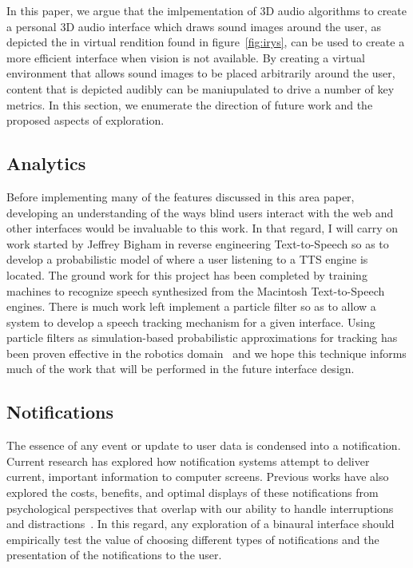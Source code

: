 In this paper, we argue that the imlpementation of 3D audio algorithms to create 
a personal 3D audio interface which draws sound images around the user, as depicted
the in virtual rendition found in figure~\ref{fig:irys}, can be used to create
a more efficient interface when vision is not available. By creating a virtual
environment that allows sound images to be placed arbitrarily around the user,
content that is depicted audibly can be maniupulated to drive a number of key 
metrics. In this section, we enumerate the direction of future work and the 
proposed aspects of exploration.

\subsection{                  Analytics                                      }

Before implementing many of the features discussed in this area paper,
developing an understanding of the ways blind users interact with the web and
other interfaces would be invaluable to this work.  In that regard, I will carry
on work started by Jeffrey Bigham in reverse engineering Text-to-Speech so as
to develop a probabilistic model of where a user listening to a TTS engine is
located.  The ground work for this project has been completed by training
machines to recognize speech synthesized from the Macintosh Text-to-Speech
engines.  There is much work left implement a particle filter so as to allow a
system to develop a speech tracking mechanism for a given interface. Using
particle filters as simulation-based probabilistic approximations for tracking
has been proven effective in the robotics domain~\cite{hightower2004particle}
and we hope this technique informs much of the work that will be performed in
the future interface design.


\subsection{                  Notifications                                  }

The essence of any event or update to user data is condensed into a
notification.  Current research has explored how notification systems attempt to
deliver current, important information to computer screens.  Previous works have
also explored the costs, benefits, and optimal displays of these notifications
from psychological perspectives that overlap with our ability to handle
interruptions and distractions~\cite{McCrickard2003509,
cutrell2001notification}. In this regard, any exploration of a binaural interface
should empirically test the value of choosing different types of notifications 
and the presentation of the notifications to the user.


